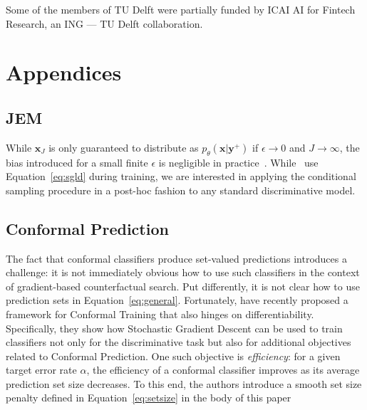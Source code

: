 \documentclass{article}
\begin{document}
\begin{ack}

Some of the members of TU Delft were partially funded by ICAI AI for Fintech Research, an ING — TU Delft
collaboration.

\end{ack}



\appendix
\section*{Appendices}
\renewcommand{\thesubsection}{\Alph{subsection}}

\subsection{JEM}\label{app-jem}

While $\mathbf{x}_J$ is only guaranteed to distribute as $p_{\theta}(\mathbf{x}|\mathbf{y}^+)$ if $\epsilon \rightarrow 0$ and $J \rightarrow \infty$, the bias introduced for a small finite $\epsilon$ is negligible in practice~\citep{murphy2023probabilistic,grathwohl2020your}. While~\citet{grathwohl2020your} use Equation~\ref{eq:sgld} during training, we are interested in applying the conditional sampling procedure in a post-hoc fashion to any standard discriminative model. 

\subsection{Conformal Prediction}\label{app-cp}

The fact that conformal classifiers produce set-valued predictions introduces a challenge: it is not immediately obvious how to use such classifiers in the context of gradient-based counterfactual search. Put differently, it is not clear how to use prediction sets in Equation~\ref{eq:general}. Fortunately, \citet{stutz2022learning} have recently proposed a framework for Conformal Training that also hinges on differentiability. Specifically, they show how Stochastic Gradient Descent can be used to train classifiers not only for the discriminative task but also for additional objectives related to Conformal Prediction. One such objective is \textit{efficiency}: for a given target error rate $\alpha$, the efficiency of a conformal classifier improves as its average prediction set size decreases. To this end, the authors introduce a smooth set size penalty defined in Equation~\ref{eq:setsize} in the body of this paper
\end{document}
